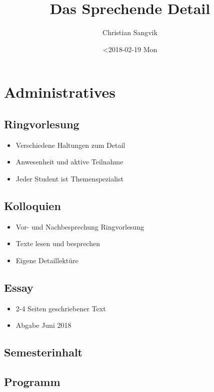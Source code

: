 \documentclass[11pt]{article}
\author{Christian Sangvik}
\date{<2018-02-19 Mon}
\title{Das Sprechende Detail}
\begin{document}
\maketitle
\tableofcontents


\section{Administratives}
\label{sec-1}

\subsection{Ringvorlesung}
\label{sec-1-1}

\begin{itemize}
\item Verschiedene Haltungen zum Detail
\item Anwesenheit und aktive Teilnahme
\item Jeder Student ist Themenspezialist
\end{itemize}

\subsection{Kolloquien}
\label{sec-1-2}

\begin{itemize}
\item Vor- und Nachbesprechung Ringvorlesung
\item Texte lesen und besprechen
\item Eigene Detaillektüre
\end{itemize}

\subsection{Essay}
\label{sec-1-3}

\begin{itemize}
\item 2-4 Seiten geschriebener Text
\item Abgabe Juni 2018
\end{itemize}

\subsection{Semesterinhalt}
\label{sec-1-4}

\subsection{Programm}
\label{sec-1-5}
\end{document}
